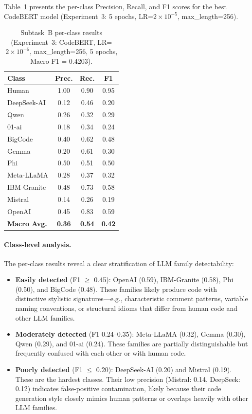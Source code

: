 \documentclass[11pt]{article}
\begin{document}
Table~\ref{tab:taskB_perclass} presents the per-class Precision, Recall, and F1 scores for the best CodeBERT model (Experiment~3: 5 epochs, LR=$2{\times}10^{-5}$, max\_length=256).

\begin{table}[htbp]
\centering
\footnotesize
\begin{tabularx}{\columnwidth}{@{}l c c c@{}}
\toprule
\textbf{Class} & \textbf{Prec.} & \textbf{Rec.} & \textbf{F1} \\ \midrule
Human & 1.00 & 0.90 & 0.95 \\
DeepSeek-AI & 0.12 & 0.46 & 0.20 \\
Qwen & 0.26 & 0.32 & 0.29 \\
01-ai & 0.18 & 0.34 & 0.24 \\
BigCode & 0.40 & 0.62 & 0.48 \\
Gemma & 0.20 & 0.61 & 0.30 \\
Phi & 0.50 & 0.51 & 0.50 \\
Meta-LLaMA & 0.28 & 0.37 & 0.32 \\
IBM-Granite & 0.48 & 0.73 & 0.58 \\
Mistral & 0.14 & 0.26 & 0.19 \\
OpenAI & 0.45 & 0.83 & 0.59 \\ \midrule
\textbf{Macro Avg.} & \textbf{0.36} & \textbf{0.54} & \textbf{0.42} \\
\bottomrule
\end{tabularx}
\caption{Subtask~B per-class results (Experiment~3: CodeBERT, LR=$2{\times}10^{-5}$, max\_length=256, 5 epochs, Macro F1 = 0.4203).}
\label{tab:taskB_perclass}
\end{table}

\paragraph{Class-level analysis.}
The per-class results reveal a clear stratification of LLM family detectability:

\begin{itemize}
    \item \textbf{Easily detected} (F1 $\geq$ 0.45): OpenAI (0.59), IBM-Granite (0.58), Phi (0.50), and BigCode (0.48). These families likely produce code with distinctive stylistic signatures---e.g., characteristic comment patterns, variable naming conventions, or structural idioms that differ from human code and other LLM families.
    \item \textbf{Moderately detected} (F1 0.24--0.35): Meta-LLaMA (0.32), Gemma (0.30), Qwen (0.29), and 01-ai (0.24). These families are partially distinguishable but frequently confused with each other or with human code.
    \item \textbf{Poorly detected} (F1 $\leq$ 0.20): DeepSeek-AI (0.20) and Mistral (0.19). These are the hardest classes. Their low precision (Mistral: 0.14, DeepSeek: 0.12) indicates false-positive contamination, likely because their code generation style closely mimics human patterns or overlaps heavily with other LLM families.
\end{itemize}
\end{document}
